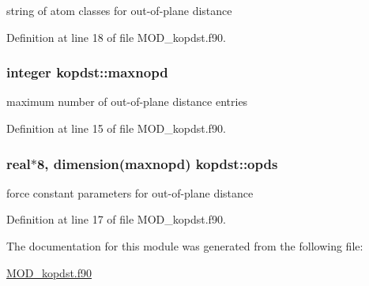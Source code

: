 string of atom classes for out-\/of-\/plane distance 



Definition at line 18 of file M\-O\-D\-\_\-kopdst.\-f90.

\hypertarget{classkopdst_a2ce74a9ed60425c4792704097c5b2d23}{
\subsubsection[{maxnopd}]{\setlength{\rightskip}{0pt plus 5cm}integer kopdst\-::maxnopd}}\label{classkopdst_a2ce74a9ed60425c4792704097c5b2d23}


maximum number of out-\/of-\/plane distance entries 



Definition at line 15 of file M\-O\-D\-\_\-kopdst.\-f90.

\hypertarget{classkopdst_a83b00cc655f480bf2d21024fef8e92fc}{
\subsubsection[{opds}]{\setlength{\rightskip}{0pt plus 5cm}real$\ast$8, dimension({\bf maxnopd}) kopdst\-::opds}}\label{classkopdst_a83b00cc655f480bf2d21024fef8e92fc}


force constant parameters for out-\/of-\/plane distance 



Definition at line 17 of file M\-O\-D\-\_\-kopdst.\-f90.



The documentation for this module was generated from the following file\-:\begin{DoxyCompactItemize}
\item 
\hyperlink{MOD__kopdst_8f90}{M\-O\-D\-\_\-kopdst.\-f90}\end{DoxyCompactItemize}
